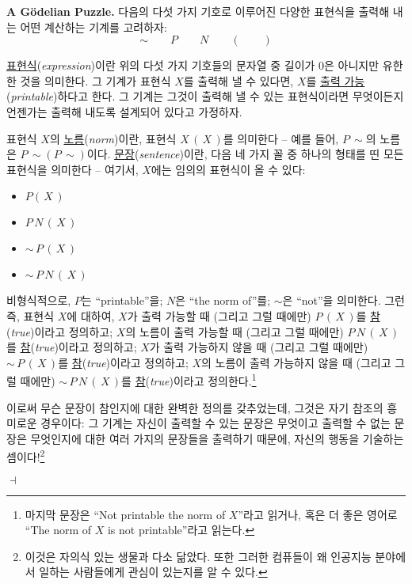 \documentclass[12pt]{paper}
\newenvironment{context}[1][]
{ \noindent \textbf{{#1}.} }
{ \hfill $ \dashv $ }
\begin{document}
\begin{context}[A G\"odelian Puzzle]
다음의 다섯 가지 기호로 이루어진 다양한 표현식을 출력해 내는 어떤 계산하는 기계를 고려하자:
$$ \sim \qquad P \qquad N \qquad \left( \right. \qquad \left. \right) $$

\underline{표현식}(\textit{expression})이란 위의 다섯 가지 기호들의 문자열 중 길이가 $0$은 아니지만 유한한 것을 의미한다.
그 기계가 표현식 $X$를 출력해 낼 수 있다면,
$X$를 \underline{출력 가능}(\textit{printable})하다고 한다.
그 기계는 그것이 출력해 낼 수 있는 표현식이라면 무엇이든지 언젠가는 출력해 내도록 설계되어 있다고 가정하자.

표현식 $X$의 \underline{노름}(\textit{norm})이란,
표현식 $X \, \left( \, X \, \right)$를 의미한다 --
예를 들어, $P \, \sim$의 노름은 $P \, \sim \left( P \, \sim \right)$이다.
\underline{문장}(\textit{sentence})이란, 다음 네 가지 꼴 중 하나의 형태를 띤 모든 표현식을 의미한다 --
여기서, $X$에는 임의의 표현식이 올 수 있다:
\begin{itemize}
\item[(1)] $P \left( \, X \, \right)$
\item[(2)] $P \, N \, \left( \, X \, \right)$
\item[(3)] $\sim \, P \, \left( \, X \, \right)$
\item[(4)] $\sim \, P \, N \, \left( \, X \, \right)$   
\end{itemize}

비형식적으로, $P$는 ``printable''을; $N$은 ``the norm of''를; $\sim$은 ``not''을 의미한다.
그런즉, 표현식 $X$에 대하여,
$X$가 출력 가능할 때 (그리고 그럴 때에만) $P \, \left( \, X \, \right)$를 \underline{참}(\textit{true})이라고 정의하고;
$X$의 노름이 출력 가능할 때 (그리고 그럴 때에만) $P \, N \, \left( \, X \, \right)$를 \underline{참}(\textit{true})이라고 정의하고;
$X$가 출력 가능하지 않을 때 (그리고 그럴 때에만) $\sim \, P \, \left( \, X \, \right)$를 \underline{참}(\textit{true})이라고 정의하고;
$X$의 노름이 출력 가능하지 않을 때 (그리고 그럴 때에만) $\sim \, P \, N \, \left( \, X \, \right)$를 \underline{참}(\textit{true})이라고 정의한다.\footnote
{
마지막 문장은 ``Not printable the norm of $X$''라고 읽거나,
혹은 더 좋은 영어로 ``The norm of $X$ is not printable''라고 읽는다.
}

이로써 무슨 문장이 참인지에 대한 완벽한 정의를 갖추었는데,
그것은 자기 참조의 흥미로운 경우이다:
그 기계는 자신이 출력할 수 있는 문장은 무엇이고 출력할 수 없는 문장은 무엇인지에 대한 여러 가지의 문장들을 출력하기 때문에,
자신의 행동을 기술하는 셈이다!\footnote
{
이것은 자의식 있는 생물과 다소 닮았다.
또한 그러한 컴퓨들이 왜 인공지능 분야에서 일하는 사람들에게 관심이 있는지를 알 수 있다.
}


\end{context}
\end{document}
